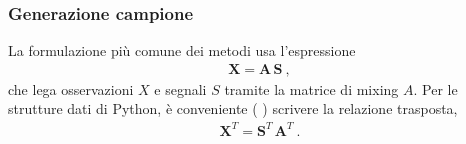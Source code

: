 \documentclass[letterpaper,10pt,italian]{jupyterBook}
\begin{document}
\subsubsection{Generazione campione}
\label{\detokenize{ch/ai/ica-pca-example-2d:generazione-campione}}
\sphinxAtStartPar
La formulazione più comune dei metodi usa l’espressione
\begin{equation*}
\begin{split}\mathbf{X} = \mathbf{A} \, \mathbf{S} \ ,\end{split}
\end{equation*}
\sphinxAtStartPar
che lega osservazioni \(X\) e segnali \(S\) tramite la matrice di mixing \(A\). Per le strutture dati di Python, è conveniente ( ) scrivere la relazione trasposta,
\begin{equation*}
\begin{split}\mathbf{X}^T = \mathbf{S}^T \, \mathbf{A}^T \ .\end{split}
\end{equation*}
\end{document}
